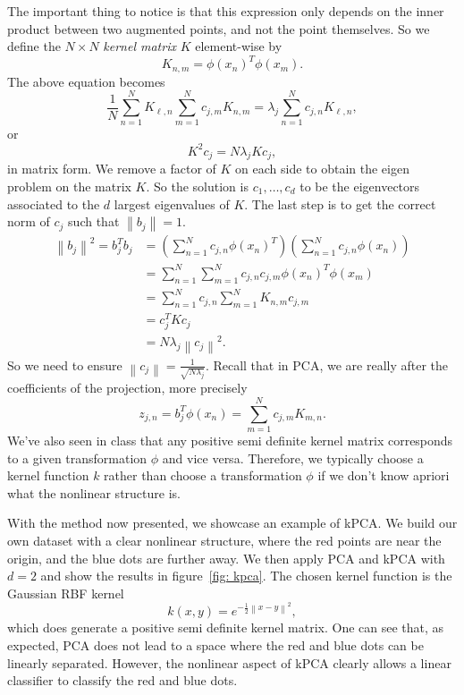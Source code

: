 \documentclass[12pt]{article}
\newcommand{\norm}[1]{\left\lVert#1\right\rVert}
\begin{document}
The important thing to notice is that this expression only depends on the inner product between two augmented points, and not the point themselves. So we define the $N \times N$ \textit{kernel matrix} $K$ element-wise by
\[
K_{n,m} = \phi(x_n)^T\phi(x_m).
\]
The above equation becomes
\[
\frac{1}{N}\sum_{n = 1}^{N} K_{\ell,n}\sum_{m = 1}^{N} c_{j,m} K_{n,m} = \lambda_j \sum_{n = 1}^{N} c_{j,n} K_{\ell,n},
\]
or
\[
K^2 c_j = N \lambda_j K c_j,
\]
in matrix form. We remove a factor of $K$ on each side to obtain the eigen problem on the matrix $K$. So the solution is $c_1, \dots, c_d$ to be the eigenvectors associated to the $d$ largest eigenvalues of $K$. The last step is to get the correct norm of $c_j$ such that $\norm{b_j} = 1$.
\[
\begin{split}
    \norm{b_j}^2 = b_j^T b_j &= \left(\sum_{n = 1}^{N} c_{j,n} \phi(x_n)^T \right) \left(\sum_{n = 1}^{N} c_{j,n} \phi(x_n)\right) \\
    &= \sum_{n = 1}^{N} \sum_{m = 1}^{N} c_{j,n}c_{j,m} \phi(x_n)^T \phi(x_m) \\
    &= \sum_{n = 1}^{N} c_{j,n} \sum_{m = 1}^{N} K_{n,m} c_{j,m} \\
    &= c_j^T K c_j \\
    &= N \lambda_j \norm{c_j}^2.
\end{split}
\]
So we need to ensure $\norm{c_j} = \frac{1}{\sqrt{N \lambda_j}}$. Recall that in PCA, we are really after the coefficients of the projection, more precisely
\[
z_{j,n} = b_j^T \phi(x_n) = \sum_{m = 1}^{N} c_{j,m} K_{m,n}.
\]
We've also seen in class that any positive semi definite kernel matrix corresponds to a given transformation $\phi$ and vice versa. Therefore, we typically choose a kernel function $k$ rather than choose a transformation $\phi$ if we don't know apriori what the nonlinear structure is.

With the method now presented, we showcase an example of kPCA. We build our own dataset with a clear nonlinear structure, where the red points are near the origin, and the blue dots are further away. We then apply PCA and kPCA with $d = 2$ and show the results in figure~\ref{fig: kpca}. The chosen kernel function is the Gaussian RBF kernel
\[
k(x,y) = e^{-\frac{1}{2}\norm{x-y}^2},
\]
which does generate a positive semi definite kernel matrix. One can see that, as expected, PCA does not lead to a space where the red and blue dots can be linearly separated. However, the nonlinear aspect of kPCA clearly allows a linear classifier to classify the red and blue dots.
\end{document}
